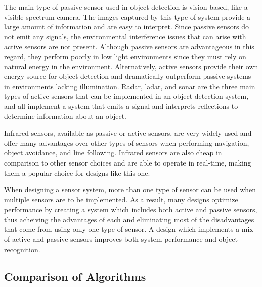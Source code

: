 The main type of passive sensor used in object detection is vision based, like a visible spectrum camera.  The images captured by this type of system provide a large amount of information and are easy to interpret. Since passive sensors do not emit any signals, the environmental interference issues that can arise with active sensors are not present.  Although passive sensors are advantageous in this regard, they perform poorly in low light environments since they must rely on natural energy in the environment.  Alternatively, active sensors provide their own energy source for object detection and dramatically outperform passive systems in environments lacking illumination.  Radar, ladar, and sonar are the three main types of active sensors that can be implemented in an object detection system, and all implement a system that emits a signal and interprets reflections to determine information about an object.  \cite{Discant}

Infrared sensors, available as passive or active sensors, are very widely used and offer many advantages over other types of sensors when performing navigation, object avoidance, and line following.  Infrared sensors are also cheap in comparison to other sensor choices and are able to operate in real-time, making them a popular choice for designs like this one.\cite{Calin}

When designing a sensor system, more than one type of sensor can be used when multiple sensors are to be implemented.  As a result, many designs optimize performance by creating a system which includes both active and passive sensors, thus acheiving the advantages of each and eliminating most of the disadvantages that come from using only one type of sensor.  A design which implements a mix of active and passive sensors improves both system performance and object recognition. \cite{Discant}  

\subsection*{Comparison of Algorithms}






